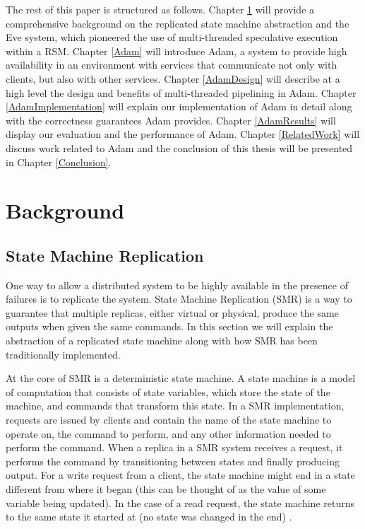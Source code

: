 \documentclass[11pt, oneside]{report}
\begin{document}
The rest of this paper is structured as follows. 
Chapter \ref{Background} will provide a comprehensive background on the replicated state machine abstraction and the Eve system, which pioneered the use of multi-threaded speculative execution within a RSM. 
Chapter \ref{Adam} will introduce Adam, a system to provide high availability in an environment with services that communicate not only with clients, but also with other services. 
Chapter \ref{AdamDesign} will describe at a high level the design and benefits of multi-threaded pipelining in Adam. 
Chapter \ref{AdamImplementation} will explain our implementation of Adam in detail along with the correctness guarantees Adam provides. 
Chapter \ref{AdamResults} will display our evaluation and the performance of Adam. 
Chapter \ref{RelatedWork} will discuss work related to Adam and the conclusion of this thesis will be presented in Chapter \ref{Conclusion}.

\chapter{Background}\label{Background}
\section{State Machine Replication}
One way to allow a distributed system to be highly available in the presence of failures is to replicate the system.
State Machine Replication (SMR) is a way to guarantee that multiple replicas, either virtual or physical, produce the same outputs when given the same commands. 
In this section we will explain the abstraction of a replicated state machine along with how SMR has been traditionally implemented.

At the core of SMR is a deterministic state machine. 
A state machine is a model of computation that consists of state variables, which store the state of the machine, and commands that transform this state. 
In a SMR implementation, requests are issued by clients and contain the name of the state machine to operate on, the command to perform, and any other information needed to perform the command. 
When a replica in a SMR system receives a request, it performs the command by transitioning between states and finally producing output. 
For a write request from a client, the state machine might end in a state different from where it began (this can be thought of as the value of some variable being updated). 
In the case of a read request, the state machine returns to the same state it started at (no state was changed in the end) \cite{schneider}.
\end{document}
